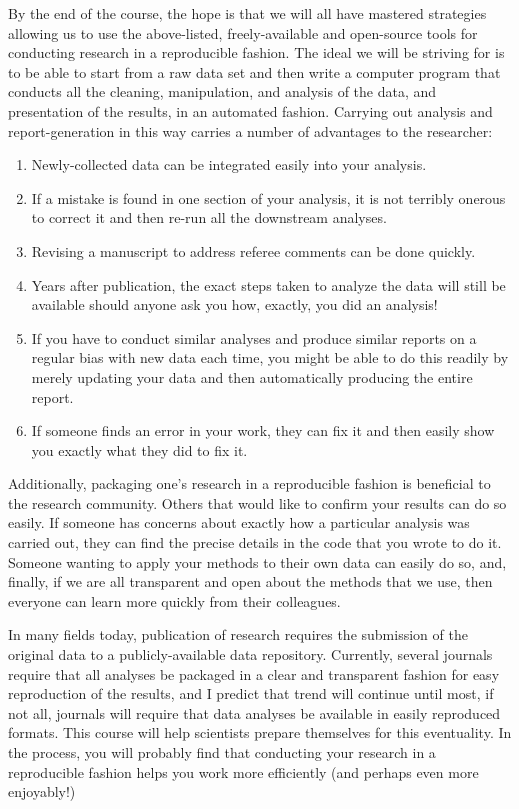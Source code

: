 \documentclass[]{book}
\providecommand{\tightlist}{%
  \setlength{\itemsep}{0pt}\setlength{\parskip}{0pt}}
\theoremstyle{definition}
\theoremstyle{definition}
\theoremstyle{remark}
\begin{document}
By the end of the course, the hope is that we will all have mastered
strategies allowing us to use the above-listed, freely-available and
open-source tools for conducting research in a reproducible fashion. The
ideal we will be striving for is to be able to start from a raw data set
and then write a computer program that conducts all the cleaning,
manipulation, and analysis of the data, and presentation of the results,
in an automated fashion. Carrying out analysis and report-generation in
this way carries a number of advantages to the researcher:

\begin{enumerate}
\def\labelenumi{\arabic{enumi}.}
\tightlist
\item
  Newly-collected data can be integrated easily into your analysis.
\item
  If a mistake is found in one section of your analysis, it is not
  terribly onerous to correct it and then re-run all the downstream
  analyses.
\item
  Revising a manuscript to address referee comments can be done quickly.
\item
  Years after publication, the exact steps taken to analyze the data
  will still be available should anyone ask you how, exactly, you did an
  analysis!
\item
  If you have to conduct similar analyses and produce similar reports on
  a regular bias with new data each time, you might be able to do this
  readily by merely updating your data and then automatically producing
  the entire report.
\item
  If someone finds an error in your work, they can fix it and then
  easily show you exactly what they did to fix it.
\end{enumerate}

Additionally, packaging one's research in a reproducible fashion is
beneficial to the research community. Others that would like to confirm
your results can do so easily. If someone has concerns about exactly how
a particular analysis was carried out, they can find the precise details
in the code that you wrote to do it. Someone wanting to apply your
methods to their own data can easily do so, and, finally, if we are all
transparent and open about the methods that we use, then everyone can
learn more quickly from their colleagues.

In many fields today, publication of research requires the submission of
the original data to a publicly-available data repository. Currently,
several journals require that all analyses be packaged in a clear and
transparent fashion for easy reproduction of the results, and I predict
that trend will continue until most, if not all, journals will require
that data analyses be available in easily reproduced formats. This
course will help scientists prepare themselves for this eventuality. In
the process, you will probably find that conducting your research in a
reproducible fashion helps you work more efficiently (and perhaps even
more enjoyably!)
\end{document}
